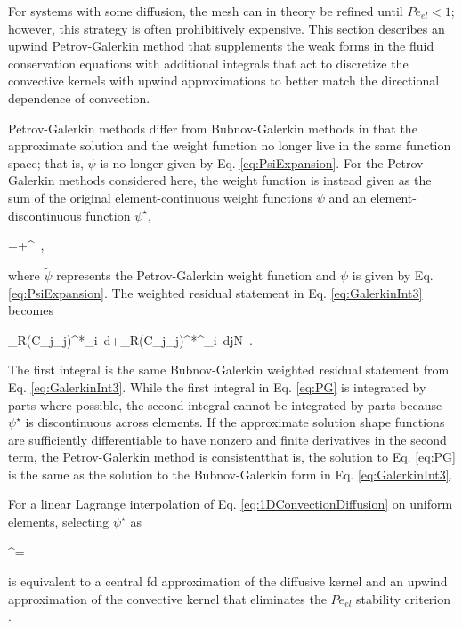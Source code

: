 For systems with some diffusion, the mesh can in theory be refined until \(Pe_{el}<1\); however, this strategy is often prohibitively expensive. This section describes an upwind Petrov-Galerkin method that supplements the weak forms in the fluid conservation equations with additional integrals that act to discretize the convective kernels with upwind approximations to better match the directional dependence of convection.

Petrov-Galerkin methods differ from Bubnov-Galerkin methods in that the approximate solution and the weight function no longer live in the same function space; that is, \(\psi\) is no longer given by Eq. \eqref{eq:PsiExpansion}. For the Petrov-Galerkin methods considered here, the weight function is instead given as the sum of the original element-continuous weight functions \(\psi\) and an element-discontinuous function \(\psi^\star\),

\beq
\label{eq:pgwf}
\tilde{\psi}=\psi+\psi^\star\ ,
\eeq

\noindent where \(\tilde{\psi}\) represents the Petrov-Galerkin weight function and \(\psi\) is given by Eq. \eqref{eq:PsiExpansion}. The weighted residual statement in Eq. \eqref{eq:GalerkinInt3} becomes

\beq
\label{eq:PG}
\int_{\Omega}\left\lbrack R\left(C_j\phi_j\right)\right\rbrack^*\phi_i\ d\Omega+\int_{\Omega}\left\lbrack R\left(C_j\phi_j\right)\right\rbrack^*\psi^\star_i\ d\hspace{1cm}j\in N\ .
\eeq

\noindent The first integral is the same Bubnov-Galerkin weighted residual statement from Eq. \eqref{eq:GalerkinInt3}. While the first integral in Eq. \eqref{eq:PG} is integrated by parts where possible, the second integral cannot be integrated by parts because \(\psi^\star\) is discontinuous across elements. If the approximate solution shape functions are sufficiently differentiable to have nonzero and finite derivatives in the second term, the Petrov-Galerkin method is consistent\mdash that is, the solution to Eq. \eqref{eq:PG} is the same as the solution to the Bubnov-Galerkin form in Eq. \eqref{eq:GalerkinInt3}.

For a linear Lagrange interpolation of Eq. \eqref{eq:1DConvectionDiffusion} on uniform elements, selecting \(\psi^\star\) as

\beq
\label{eq:psiStar}
\psi^\star=\cdot\nabla\psi\ 
\eeq

\noindent is equivalent to a central \gls{fd} approximation of the diffusive kernel and an upwind approximation of the convective kernel that eliminates the \(Pe_{el}\) stability criterion \cite{zienkiewicz,brooks,novak_manual}. 

